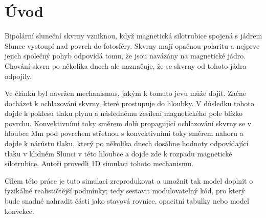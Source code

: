 \chapter*{Úvod}

Bipolární sluneční skvrny vzniknou, když magnetická silotrubice spojená s jádrem Slunce vystoupí nad povrch do fotosféry. Skvrny mají opačnou polaritu a nejprve jejich společný pohyb odpovídá tomu, že jsou navázány na magnetické jádro. Chování skvrn po několika dnech ale naznačuje, že se skvrny od tohoto jádra odpojily.

Ve článku \cite{dd} byl navržen mechanismus, jakým k tomuto jevu může dojít. Začne docházet k ochlazování skvrny, které prostupuje do hloubky. V důsledku tohoto dojde k poklesu tlaku plynu a následnému zesílení magnetického pole blízko povrchu. Konvektivními toky směrem dolů propagující ochlazování skvrny se v hloubce \unit[2-10]{Mm} pod povrchem střetnou s konvektivními toky směrem nahoru a dojde k nárůstu tlaku, který po několika dnech dosáhne hodnoty odpovídající tlaku v klidném Slunci v této hloubce a dojde zde k rozpadu magnetické silotrubice. Autoři provedli 1D simulaci tohoto mechanismu.

Cílem této práce je tuto simulaci zreprodukovat a umožnit tak model doplnit o fyzikálně realističtější podmínky; tedy sestavit modulovatelný kód, pro který bude snadné nahradit části jako stavová rovnice, opacitní tabulky nebo model konvekce.